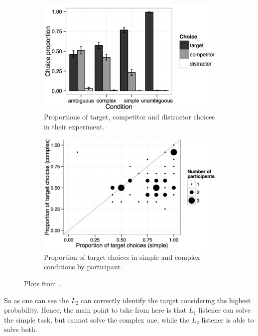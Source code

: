 \begin{figure}
\centering
\begin{subfigure}{.5\textwidth}
  \centering
  \includegraphics[width=1\linewidth]{images/trials_stats.png}
  \caption{Proportions of target, competitor and distractor choices in their experiment. }
  \label{fig:trial_stats}
\end{subfigure}%
\begin{subfigure}{.5\textwidth}
  \centering
  \includegraphics[width=1\linewidth]{images/l1_l2_stats.png}
  \caption{Proportion of target choices in simple and complex conditions by participant. }
  \label{fig:prob_stats}
\end{subfigure}
\caption{Plots from \cite{Franke_2016}.}
\label{fig:stats}
\end{figure}

So as one can see the $L_2$ can correctly identify the target considering the highest probability. Hence, the main point to take from here is that $L_1$ listener can solve the simple task, but cannot solve the complex one, while the $L_2$ listener is able to solve both. 

